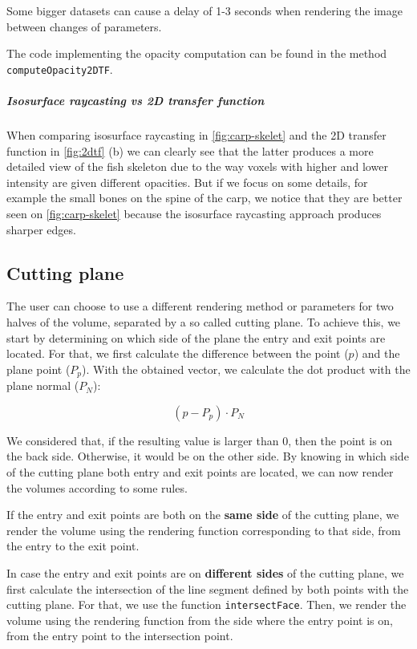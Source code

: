 \documentclass[a4paper]{article}
\begin{document}
Some bigger datasets can cause a delay of 1-3 seconds when rendering the image between changes of parameters.

The code implementing the opacity computation can be found in the method {\tt computeOpacity2DTF}.

\subparagraph{Isosurface raycasting vs 2D transfer function}

When comparing isosurface raycasting in \autoref{fig:carp-skelet} and the 2D transfer function in \autoref{fig:2dtf} (b) we can clearly see that the latter produces a more detailed view of the fish skeleton due to the way voxels with higher and lower intensity are given different opacities. But if we focus on some details, for example the small bones on the spine of the carp, we notice that they are better seen on \autoref{fig:carp-skelet} because the isosurface raycasting approach produces sharper edges.

\subsection{Cutting plane}

The user can choose to use a different rendering method or parameters for two halves of the volume, separated by a so called cutting plane. To achieve this, we start by determining on which side of the plane the entry and exit points are located. For that, we first calculate the difference between the point ($p$) and the plane point ($P_p$). With the obtained vector, we calculate the dot product with the plane normal ($P_N$):

$$(p-P_p)\cdot P_N$$

We considered that, if the resulting value is larger than 0, then the point is on the back side. Otherwise, it would be on the other side. By knowing in which side of the cutting plane both entry and exit points are located, we can now render the volumes according to some rules.

If the entry and exit points are both on the \textbf{same side} of the cutting plane, we render the volume using the rendering function corresponding to that side, from the entry to the exit point.

In case the entry and exit points are on \textbf{different sides} of the cutting plane, we first calculate the intersection of the line segment defined by both points with the cutting plane. For that, we use the function {\tt intersectFace}. Then, we render the volume using the rendering function from the side where the entry point is on, from the entry point to the intersection point.
\end{document}
